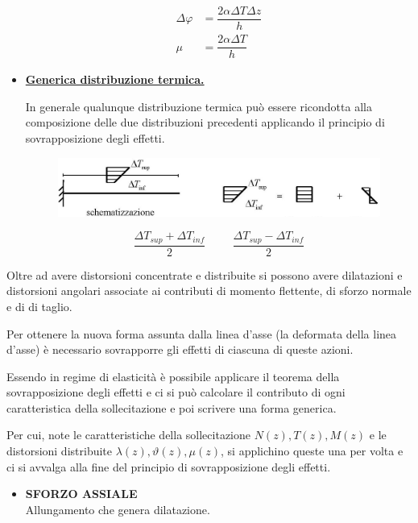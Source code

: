 \documentclass{article}
\begin{document}
\begin{adjustwidth}{2in}{}
\begin{itemize}
		\[
		\begin{split}
			\Delta\varphi & = \dfrac{2\alpha\Delta T \Delta z}{h}\\
			\mu & = \dfrac{2\alpha\Delta T}{h}
		\end{split}
		\]
		
		\item \textbf{\underline{Generica distribuzione termica.}}
		
		In generale qualunque distribuzione termica può essere ricondotta alla composizione delle due distribuzioni
		precedenti applicando il principio di sovrapposizione degli effetti.
		
\begin{figure}[H]
	\centering
	\includegraphics[width=0.7\linewidth]{"immagini/1.PARTE8_Pagina_06"}
\end{figure}

		\[
			\dfrac{\Delta T_{sup} + \Delta T_{inf}}{2} \hspace{1cm}
			\dfrac{\Delta T_{sup} - \Delta T_{inf}}{2}
		\] 
		\end{itemize}
		Oltre ad avere distorsioni concentrate e distribuite si possono avere dilatazioni e distorsioni angolari associate ai contributi di momento flettente, di sforzo normale e di  di taglio. \newline 
		
		Per ottenere la nuova forma assunta dalla linea d'asse (la deformata della linea d'asse) è necessario sovrapporre gli effetti di ciascuna di queste azioni. \newline 
		
		Essendo in regime di elasticità è possibile applicare il teorema della sovrapposizione degli effetti e ci si può calcolare il contributo di ogni caratteristica della sollecitazione e poi scrivere una forma generica. \newline
		
		Per cui, note le caratteristiche della sollecitazione $ N(z), T(z), M(z) $ e le distorsioni distribuite $ \lambda(z), \vartheta(z), \mu(z) $, si applichino queste una per volta e ci si avvalga alla fine del principio di sovrapposizione degli effetti.
\newpage		
		\begin{itemize}
			\item \textbf{SFORZO ASSIALE} \\
			Allungamento che genera dilatazione. 
			

\end{itemize}
\end{adjustwidth}
\end{document}
